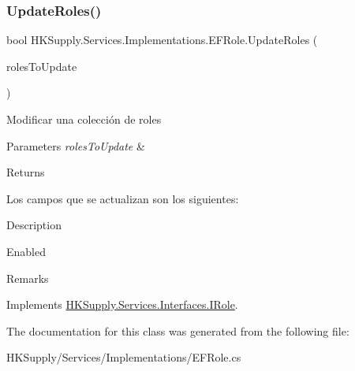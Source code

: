 \subsubsection{\texorpdfstring{Update\+Roles()}{UpdateRoles()}}
{\footnotesize\ttfamily bool H\+K\+Supply.\+Services.\+Implementations.\+E\+F\+Role.\+Update\+Roles (\begin{DoxyParamCaption}\item[{I\+Enumerable$<$ \mbox{\hyperlink{class_h_k_supply_1_1_models_1_1_role}{Role}} $>$}]{roles\+To\+Update }\end{DoxyParamCaption})}



Modificar una colección de roles 


\begin{DoxyParams}{Parameters}
{\em roles\+To\+Update} & \\
\hline
\end{DoxyParams}
\begin{DoxyReturn}{Returns}

\end{DoxyReturn}


Los campos que se actualizan son los siguientes\+:
\begin{DoxyItemize}
\item Description
\item Enabled
\item Remarks 
\end{DoxyItemize}

Implements \mbox{\hyperlink{interface_h_k_supply_1_1_services_1_1_interfaces_1_1_i_role}{H\+K\+Supply.\+Services.\+Interfaces.\+I\+Role}}.



The documentation for this class was generated from the following file\+:\begin{DoxyCompactItemize}
\item 
H\+K\+Supply/\+Services/\+Implementations/E\+F\+Role.\+cs\end{DoxyCompactItemize}
